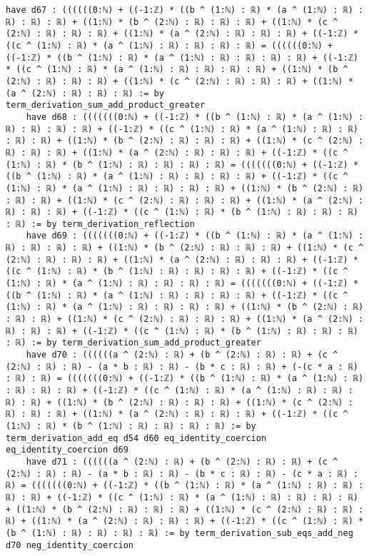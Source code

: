 \documentclass{article}
\begin{document}
\begin{tcolorbox}[colback=white!10, width=\linewidth]
\begin{lstlisting}[language=Lean4]
    have d67 : ((((((0:ℕ) + ((-1:ℤ) * ((b ^ (1:ℕ) : ℝ) * (a ^ (1:ℕ) : ℝ) : ℝ) : ℝ) : ℝ) + ((1:ℕ) * (b ^ (2:ℕ) : ℝ) : ℝ) : ℝ) + ((1:ℕ) * (c ^ (2:ℕ) : ℝ) : ℝ) : ℝ) + ((1:ℕ) * (a ^ (2:ℕ) : ℝ) : ℝ) : ℝ) + ((-1:ℤ) * ((c ^ (1:ℕ) : ℝ) * (a ^ (1:ℕ) : ℝ) : ℝ) : ℝ) : ℝ) = ((((((0:ℕ) + ((-1:ℤ) * ((b ^ (1:ℕ) : ℝ) * (a ^ (1:ℕ) : ℝ) : ℝ) : ℝ) : ℝ) + ((-1:ℤ) * ((c ^ (1:ℕ) : ℝ) * (a ^ (1:ℕ) : ℝ) : ℝ) : ℝ) : ℝ) + ((1:ℕ) * (b ^ (2:ℕ) : ℝ) : ℝ) : ℝ) + ((1:ℕ) * (c ^ (2:ℕ) : ℝ) : ℝ) : ℝ) + ((1:ℕ) * (a ^ (2:ℕ) : ℝ) : ℝ) : ℝ) := by term_derivation_sum_add_product_greater
    have d68 : (((((((0:ℕ) + ((-1:ℤ) * ((b ^ (1:ℕ) : ℝ) * (a ^ (1:ℕ) : ℝ) : ℝ) : ℝ) : ℝ) + ((-1:ℤ) * ((c ^ (1:ℕ) : ℝ) * (a ^ (1:ℕ) : ℝ) : ℝ) : ℝ) : ℝ) + ((1:ℕ) * (b ^ (2:ℕ) : ℝ) : ℝ) : ℝ) + ((1:ℕ) * (c ^ (2:ℕ) : ℝ) : ℝ) : ℝ) + ((1:ℕ) * (a ^ (2:ℕ) : ℝ) : ℝ) : ℝ) + ((-1:ℤ) * ((c ^ (1:ℕ) : ℝ) * (b ^ (1:ℕ) : ℝ) : ℝ) : ℝ) : ℝ) = (((((((0:ℕ) + ((-1:ℤ) * ((b ^ (1:ℕ) : ℝ) * (a ^ (1:ℕ) : ℝ) : ℝ) : ℝ) : ℝ) + ((-1:ℤ) * ((c ^ (1:ℕ) : ℝ) * (a ^ (1:ℕ) : ℝ) : ℝ) : ℝ) : ℝ) + ((1:ℕ) * (b ^ (2:ℕ) : ℝ) : ℝ) : ℝ) + ((1:ℕ) * (c ^ (2:ℕ) : ℝ) : ℝ) : ℝ) + ((1:ℕ) * (a ^ (2:ℕ) : ℝ) : ℝ) : ℝ) + ((-1:ℤ) * ((c ^ (1:ℕ) : ℝ) * (b ^ (1:ℕ) : ℝ) : ℝ) : ℝ) : ℝ) := by term_derivation_reflection
    have d69 : (((((((0:ℕ) + ((-1:ℤ) * ((b ^ (1:ℕ) : ℝ) * (a ^ (1:ℕ) : ℝ) : ℝ) : ℝ) : ℝ) + ((1:ℕ) * (b ^ (2:ℕ) : ℝ) : ℝ) : ℝ) + ((1:ℕ) * (c ^ (2:ℕ) : ℝ) : ℝ) : ℝ) + ((1:ℕ) * (a ^ (2:ℕ) : ℝ) : ℝ) : ℝ) + ((-1:ℤ) * ((c ^ (1:ℕ) : ℝ) * (b ^ (1:ℕ) : ℝ) : ℝ) : ℝ) : ℝ) + ((-1:ℤ) * ((c ^ (1:ℕ) : ℝ) * (a ^ (1:ℕ) : ℝ) : ℝ) : ℝ) : ℝ) = (((((((0:ℕ) + ((-1:ℤ) * ((b ^ (1:ℕ) : ℝ) * (a ^ (1:ℕ) : ℝ) : ℝ) : ℝ) : ℝ) + ((-1:ℤ) * ((c ^ (1:ℕ) : ℝ) * (a ^ (1:ℕ) : ℝ) : ℝ) : ℝ) : ℝ) + ((1:ℕ) * (b ^ (2:ℕ) : ℝ) : ℝ) : ℝ) + ((1:ℕ) * (c ^ (2:ℕ) : ℝ) : ℝ) : ℝ) + ((1:ℕ) * (a ^ (2:ℕ) : ℝ) : ℝ) : ℝ) + ((-1:ℤ) * ((c ^ (1:ℕ) : ℝ) * (b ^ (1:ℕ) : ℝ) : ℝ) : ℝ) : ℝ) := by term_derivation_sum_add_product_greater
    have d70 : ((((((a ^ (2:ℕ) : ℝ) + (b ^ (2:ℕ) : ℝ) : ℝ) + (c ^ (2:ℕ) : ℝ) : ℝ) - (a * b : ℝ) : ℝ) - (b * c : ℝ) : ℝ) + (-(c * a : ℝ) : ℝ) : ℝ) = (((((((0:ℕ) + ((-1:ℤ) * ((b ^ (1:ℕ) : ℝ) * (a ^ (1:ℕ) : ℝ) : ℝ) : ℝ) : ℝ) + ((-1:ℤ) * ((c ^ (1:ℕ) : ℝ) * (a ^ (1:ℕ) : ℝ) : ℝ) : ℝ) : ℝ) + ((1:ℕ) * (b ^ (2:ℕ) : ℝ) : ℝ) : ℝ) + ((1:ℕ) * (c ^ (2:ℕ) : ℝ) : ℝ) : ℝ) + ((1:ℕ) * (a ^ (2:ℕ) : ℝ) : ℝ) : ℝ) + ((-1:ℤ) * ((c ^ (1:ℕ) : ℝ) * (b ^ (1:ℕ) : ℝ) : ℝ) : ℝ) : ℝ) := by term_derivation_add_eq d54 d60 eq_identity_coercion eq_identity_coercion d69
    have d71 : ((((((a ^ (2:ℕ) : ℝ) + (b ^ (2:ℕ) : ℝ) : ℝ) + (c ^ (2:ℕ) : ℝ) : ℝ) - (a * b : ℝ) : ℝ) - (b * c : ℝ) : ℝ) - (c * a : ℝ) : ℝ) = (((((((0:ℕ) + ((-1:ℤ) * ((b ^ (1:ℕ) : ℝ) * (a ^ (1:ℕ) : ℝ) : ℝ) : ℝ) : ℝ) + ((-1:ℤ) * ((c ^ (1:ℕ) : ℝ) * (a ^ (1:ℕ) : ℝ) : ℝ) : ℝ) : ℝ) + ((1:ℕ) * (b ^ (2:ℕ) : ℝ) : ℝ) : ℝ) + ((1:ℕ) * (c ^ (2:ℕ) : ℝ) : ℝ) : ℝ) + ((1:ℕ) * (a ^ (2:ℕ) : ℝ) : ℝ) : ℝ) + ((-1:ℤ) * ((c ^ (1:ℕ) : ℝ) * (b ^ (1:ℕ) : ℝ) : ℝ) : ℝ) : ℝ) := by term_derivation_sub_eqs_add_neg d70 neg_identity_coercion

\end{lstlisting}
\end{tcolorbox}
\end{document}
